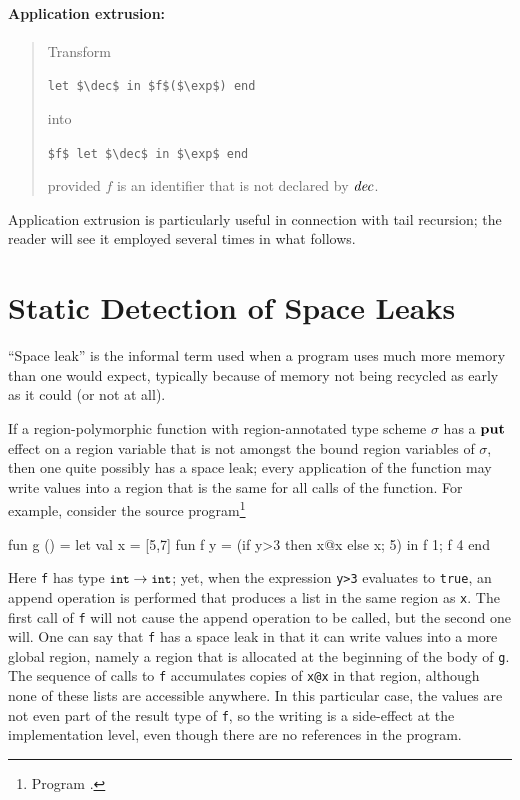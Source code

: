 \documentclass[12pt]{book}
\begin{document}
\subsubsection*{Application extrusion:}
\begin{quote}
  Transform
  \begin{center}
    \lstinline!let $\dec$ in $f$($\exp$) end!
  \end{center}
  into
  \begin{center}
    \lstinline!$f$ let $\dec$ in $\exp$ end!
  \end{center}
provided $f$ is an identifier that is not declared by ${\it dec}$.
\end{quote}

Application extrusion is particularly useful in connection with
%
%
tail recursion; the reader will see it employed several times in what follows.
%

\chapter{Static Detection of Space Leaks}
\label{spaceleak.sec}

``Space leak'' is the informal term used when a program uses much more memory
than one would expect, typically because of memory not being recycled as early
as it could (or not at all).

If a region-polymorphic function with region-annotated type scheme $\sigma$ has
a $\mathop{\bf put}\nolimits$ effect on a region variable that is not amongst the bound region
variables of $\sigma$, then one quite possibly has a space leak; every
application of the function may write values into a region that is the same for
all calls of the function. For example, consider the source
program\footnote{Program .}
\begin{smlcode}
  fun g () =
    let val x = [5,7]
        fun f y = (if y>3 then x@x else x;
                   5)
    in
      f 1; f 4
    end
\end{smlcode}
Here \lstinline{f} has type $\mbox{\small\ttfamily int}\to\mbox{\small\ttfamily int}$; yet, when the expression
\lstinline{y>3} evaluates to \lstinline{true}, an append operation is performed
that produces a list in the same region as \lstinline{x}. The first call of
\lstinline{f} will not cause the append operation to be called, but the second
one will. One can say that \lstinline{f} has a space leak in that it can write
values into a more global region, namely a region that is allocated at the
beginning of the body of \lstinline{g}. The sequence of calls to \lstinline{f}
accumulates copies of \lstinline{x@x} in that region, although none of these
lists are accessible anywhere.  In this particular case, the values are not even
part of the result type of \lstinline{f}, so the writing is a side-effect at the
implementation level, even though there are no references in the program.
\end{document}
